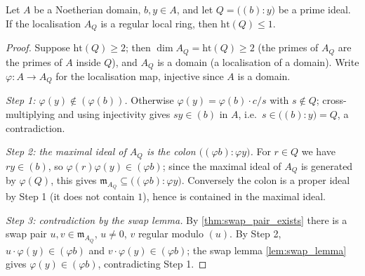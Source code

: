 \begin{theorem}
  \label{thm:colon_height_le_one}
  \leanok
  Let \(A\) be a Noetherian domain, \(b, y \in A\), and let
  \(Q = \bigl((b) : y\bigr)\) be a prime ideal. If the localisation \(A_Q\) is a
  regular local ring, then \(\mathrm{ht}(Q) \leq 1\).
\end{theorem}
\begin{proof}
  \leanok
  Suppose \(\mathrm{ht}(Q) \geq 2\); then \(\dim A_Q = \mathrm{ht}(Q) \geq 2\)
  (the primes of \(A_Q\) are the primes of \(A\) inside \(Q\)), and \(A_Q\) is a
  domain (a localisation of a domain). Write \(\varphi : A \to A_Q\) for the
  localisation map, injective since \(A\) is a domain.

  \emph{Step 1: \(\varphi(y) \notin (\varphi(b))\).} Otherwise
  \(\varphi(y) = \varphi(b) \cdot c/s\) with \(s \notin Q\); cross-multiplying
  and using injectivity gives \(s y \in (b)\) in \(A\), i.e.\
  \(s \in \bigl((b) : y\bigr) = Q\), a contradiction.

  \emph{Step 2: the maximal ideal of \(A_Q\) is the colon
  \(\bigl((\varphi b) : \varphi y\bigr)\).} For \(r \in Q\) we have
  \(r y \in (b)\), so \(\varphi(r) \varphi(y) \in (\varphi b)\); since the
  maximal ideal of \(A_Q\) is generated by \(\varphi(Q)\), this gives
  \(\mathfrak m_{A_Q} \subseteq \bigl((\varphi b) : \varphi y\bigr)\).
  Conversely the colon is a proper ideal by Step 1 (it does not contain \(1\)),
  hence is contained in the maximal ideal.

  \emph{Step 3: contradiction by the swap lemma.} By
  \ref{thm:swap_pair_exists} there is a swap pair
  \(u, v \in \mathfrak m_{A_Q}\), \(u \neq 0\), \(v\) regular modulo \((u)\).
  By Step 2, \(u \cdot \varphi(y) \in (\varphi b)\) and
  \(v \cdot \varphi(y) \in (\varphi b)\); the swap lemma \ref{lem:swap_lemma}
  gives \(\varphi(y) \in (\varphi b)\), contradicting Step 1.
\end{proof}

